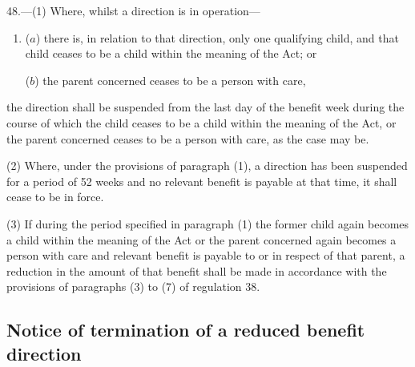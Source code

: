 \documentclass[a4paper,12pt]{article}
\begin{document}
48.—(1) Where, whilst a direction is in operation—
\begin{enumerate}\item[]
($a$) there is, in relation to that direction, only one qualifying child, and that child ceases to be a child within the meaning of the Act; or

($b$) the parent concerned ceases to be a person with care,
\end{enumerate}
the direction shall be suspended from the last day of the benefit week during the course of which the child ceases to be a child within the meaning of the Act, or the parent concerned ceases to be a person with care, as the case may be.

(2) Where, under the provisions of paragraph (1), a direction has been suspended for a period of 52 weeks and no relevant benefit is payable at that time, it shall cease to be in force.

(3) If during the period specified in paragraph (1) the former child again becomes a child within the meaning of the Act or the parent concerned again becomes a person with care and relevant benefit is payable to or in respect of that parent, a reduction in the amount of that benefit shall be made in accordance with the provisions of paragraphs (3) to (7) of regulation 38.

%
%
%

\subsection[49. Notice of termination of a reduced benefit direction]{Notice of termination of a reduced benefit direction}
\end{document}
